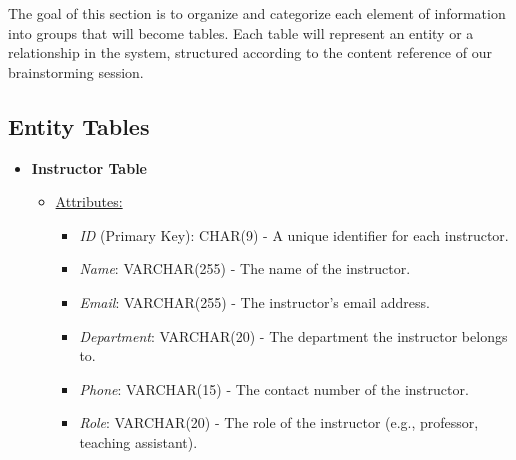 \documentclass[12pt]{article}
\begin{document}
The goal of this section is to organize and categorize each element of information into groups that will become tables. Each table will represent an entity or a relationship in the system, structured according to the content reference of our brainstorming session.

\subsection*{Entity Tables}

\begin{itemize}
    \item \textbf{Instructor Table}
    \begin{itemize}
        \item \underline{Attributes:}
        \begin{itemize}
            \item \textit{ID} (Primary Key): CHAR(9) - A unique identifier for each instructor. 
            \item \textit{Name}: VARCHAR(255) - The name of the instructor.
            \item \textit{Email}: VARCHAR(255) - The instructor's email address.
            \item \textit{Department}: VARCHAR(20) - The department the instructor belongs to.
            \item \textit{Phone}: VARCHAR(15) - The contact number of the instructor.
            \item \textit{Role}: VARCHAR(20) - The role of the instructor (e.g., professor, teaching assistant).
        \end{itemize}
    \end{itemize}
    

\end{itemize}
\end{document}
